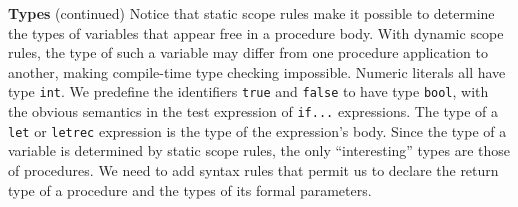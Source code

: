 \begin{minipage}[t]{\sw}
\slidenumber
\LARGE
{\bf Types} (continued)\exx
Notice that static scope rules make it possible to determine
the types of variables that appear free in a procedure body.
With dynamic scope rules,
the type of such a variable may differ
from one procedure application to another,
making compile-time type checking impossible.\exx
Numeric literals all have type \verb'int'.
We predefine the identifiers \verb'true' and \verb'false'
to have type \verb'bool',
with the obvious semantics
in the test expression of \verb'if...' expressions.
The type of a \verb'let' or \verb'letrec' expression
is the type of the expression's body.\exx
Since the type of a variable is determined by static scope rules,
the only ``interesting'' types are those of procedures.
We need to add syntax rules
that permit us to declare
the return type of a procedure and the types of its formal parameters.
\end{minipage}
